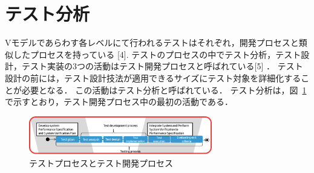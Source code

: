 \documentclass[a4paper,12pt]{jreport}
\begin{document}
\section{テスト分析}
Vモデルであらわす各レベルにて行われるテストはそれぞれ，開発プロセスと類似したプロセスを持っている [4].
テストのプロセスの中でテスト分析，テスト設計，テスト実装の3つの活動はテスト開発プロセスと呼ばれている[5] ．
テスト設計の前には，テスト設計技法が適用できるサイズにテスト対象を詳細化することが必要となる．
この活動はテスト分析と呼ばれている．
テスト分析は，図~\ref{fig:D-2-Fig2}で示すとおり，テスト開発プロセス中の最初の活動である．
\begin{figure}[h]
  \begin{center}
   \includegraphics[width=8cm]{./image/D-2-Fig2.png}
   \caption{テストプロセスとテスト開発プロセス}
   \label{fig:D-2-Fig2}
  \end{center}
\end{figure}
\end{document}
